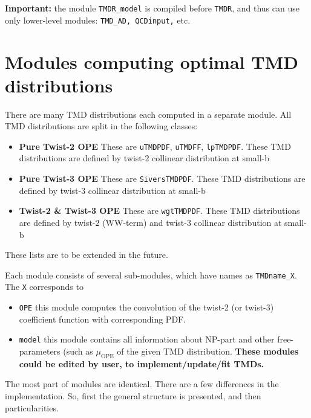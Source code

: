 \documentclass[prd,nofootinbib,eqsecnum,final]{revtex4}
\renewcommand{\(}{\left(}
\renewcommand{\)}{\right)}
\renewcommand{\[}{\left[}
\renewcommand{\]}{\right]}
\newcommand{\blue}[1]{{\color{blue} #1}}
\begin{document}
\vspace{2mm}

\textbf{Important:} the module \texttt{TMDR\_model} is compiled before \texttt{TMDR}, and thus can use only lower-level modules: \texttt{TMD\_AD, QCDinput,} etc.


\newpage

\section{Modules computing optimal TMD distributions}

There are many TMD distributions each computed in a separate module. All TMD distributions are split in the following classes:
\begin{itemize}
\item \textbf{Pure Twist-2 OPE} These are \texttt{uTMDPDF}, \texttt{uTMDFF}, \texttt{lpTMDPDF}. These TMD distributions are defined by twist-2 collinear distribution at small-b
\item \textbf{Pure Twist-3 OPE} These are \texttt{SiversTMDPDF}. These TMD distributions are defined by twist-3 collinear distribution at small-b
\item \textbf{Twist-2 \& Twist-3 OPE} These are \texttt{wgtTMDPDF}. These TMD distributions are defined by twist-2 (WW-term) and twist-3 collinear distribution at small-b
\end{itemize}
These lists are to be extended in the future. 

Each module consists of several sub-modules, which have names as \texttt{TMDname\_X}. The \texttt{X} corresponds to
\begin{itemize}
\item  \texttt{OPE} this module computes the convolution of the twist-2 (or twist-3) coefficient function with corresponding PDF.
\item \texttt{model} this module contains all information about NP-part and other free-parameters (such as $\mu_{\text{OPE}}$ of the given TMD distribution. \textbf{\blue{These modules could be edited by user, to implement/update/fit TMDs.}}
\end{itemize}

The most part of modules are identical. There are a few differences in the implementation. So, first the general structure is presented, and then particularities.
\end{document}
